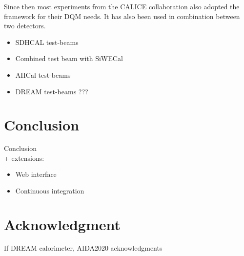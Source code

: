 \documentclass{webofc}
\begin{document}
Since then most experiments from the CALICE collaboration also adopted the framework for their DQM needs. It has also been used in combination between two detectors.

\begin{itemize}
  \item SDHCAL test-beams
  \item Combined test beam with SiWECal
  \item AHCal test-beams
  \item DREAM test-beams ???
\end{itemize}

\section{Conclusion}
\label{sec:conclusion}

Conclusion \\
+ extensions:

\begin{itemize}
  \item Web interface
  \item Continuous integration
\end{itemize}

\section{Acknowledgment}
\label{sec:acknowledgment}

If DREAM calorimeter, AIDA2020 acknowledgments
\end{document}
